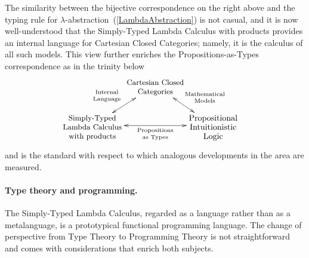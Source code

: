 \documentclass[11pt,twocolumn]{article}
\begin{document}
The similarity between the bijective correspondence on the right above and the
typing rule for \mbox{$\lambda$-abstraction}~(\ref{LambdaAbstraction}) is not
casual, and it is now well-understood that the Simply-Typed Lambda Calculus
with products provides an internal language for Cartesian Closed Categories;
namely, it is the calculus of all such models.  This view further enriches the
Propositions-as-Types correspondence as 
in the trinity below %
\begin{equation}\label{PATtrinity}
\hspace*{-3.75mm}
\begin{array}{c}
\xymatrix@C=0pt@R=17.5pt{
    & \ar@{<->}[dl]_(.5){\null\hspace*{-15mm}\txt{\scriptsize Internal\\
        \raisebox{1mm}{\scriptsize Language}}} 
    \ar@{<->}[dr]^(.55){\null\hspace*{1mm}\txt{\scriptsize Mathematical\\
        \raisebox{1mm}{\scriptsize Models}}}
    \txt{\small Cartesian Closed\\ \small Categories} & \\
    \txt{\small Simply-Typed\\ \small Lambda Calculus\\ \small with products
    }
    \ar@{<->}[rr]_-{\txt{\scriptsize
        Propositions\\\raisebox{1mm}{\scriptsize as Types}}} & & 
    \txt{Propositional\\ 
      Intuitionistic\\ Logic}
  }
\end{array}
\end{equation}
and is the standard with respect to which analogous developments in the
area are measured.  

\paragraph{Type theory and programming.}

The Simply-Typed Lambda Calculus, regarded as a language rather than as a
metalanguage, is a prototypical functional programming language.  The change
of perspective from Type Theory to Programming Theory is not straightforward
and comes with considerations that enrich both subjects.  
\end{document}
